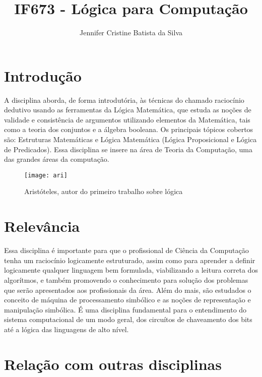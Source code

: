 \documentclass{article}
\title{IF673 - Lógica para Computação}
\author{Jennifer Cristine Batista da Silva}
\begin{document}
\maketitle

\section{Introdução}
A disciplina aborda, de forma introdutória, às técnicas do chamado raciocínio dedutivo usando as ferramentas da Lógica Matemática, que estuda as noções de validade e consistência de argumentos utilizando elementos da Matemática, tais como a teoria dos conjuntos e a álgebra booleana. Os principais tópicos cobertos são: Estruturas Matemáticas e Lógica Matemática (Lógica Proposicional e Lógica de Predicados). Essa disciplina se insere na área de Teoria da Computação, uma das grandes áreas da computação.

\begin{figure}[h!]
\centering
\texttt{[image: ari]}
\caption{Aristóteles, autor do primeiro trabalho sobre lógica}
\label{fig:ari}
\end{figure}

\section{Relevância}
Essa disciplina é importante para que o profissional de Ciência da Computação tenha um raciocínio logicamente estruturado, assim como para aprender a definir logicamente qualquer linguagem bem formulada, viabilizando a leitura correta dos algorítmos, e também promovendo o conhecimento para solução dos problemas que serão apresentados aos profissionais da área. Além do mais, são estudados o conceito de máquina de processamento simbólico e as noções de representação e manipulação simbólica. É uma disciplina fundamental para o entendimento do sistema computacional de um modo geral, dos circuítos de chaveamento dos bits até a lógica das linguagens de alto nível.

\section{Relação com outras disciplinas}
\end{document}
